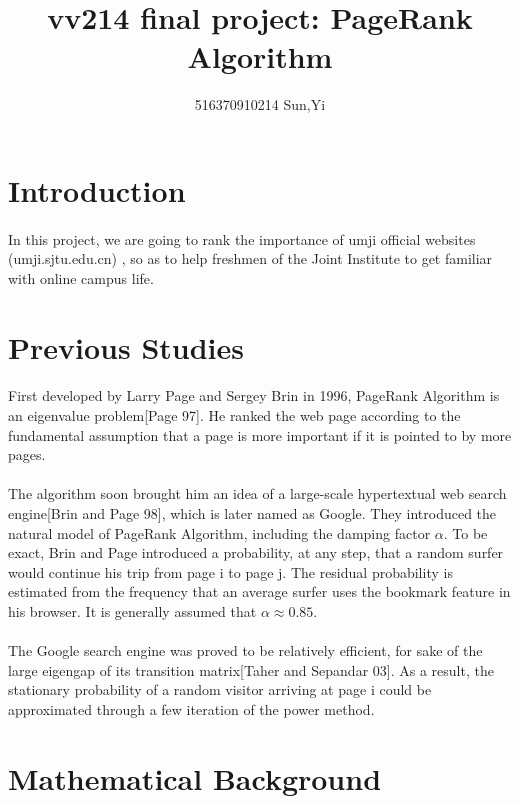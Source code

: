 \documentclass{article}
\author{516370910214 Sun,Yi}
\title{vv214 final project: PageRank Algorithm}
\begin{document}
    \maketitle
    \section{Introduction}
    \paragraph{}
    In this project, we are going to rank the importance of umji official websites (umji.sjtu.edu.cn) , so as to help freshmen of the Joint Institute to get familiar with online campus life.
    \section{Previous Studies}
    \paragraph{}
    First developed by Larry Page and Sergey Brin in 1996, PageRank Algorithm is an eigenvalue problem[Page 97]. 
    He ranked the web page according to the fundamental assumption that a page is more important if it is pointed to by more pages.
    \paragraph{}
    The algorithm soon brought him an idea of a large-scale hypertextual web search engine[Brin and Page 98], which is later named as Google.
    They introduced the natural model of PageRank Algorithm, including the damping factor $\alpha$. 
    To be exact, Brin and Page introduced a probability, at any step, that a random surfer would continue his trip from page i to page j.
    The residual probability is estimated from the frequency that an average surfer uses the bookmark feature in his browser. It is generally assumed that $\alpha\approx0.85$.
    \paragraph{}
    The Google search engine was proved to be relatively efficient, for sake of the large eigengap of its transition matrix[Taher and Sepandar 03]. 
    As a result, the stationary probability of a random visitor arriving at page i could be approximated through a few iteration of the power method.
    \section{Mathematical Background}
\end{document}
